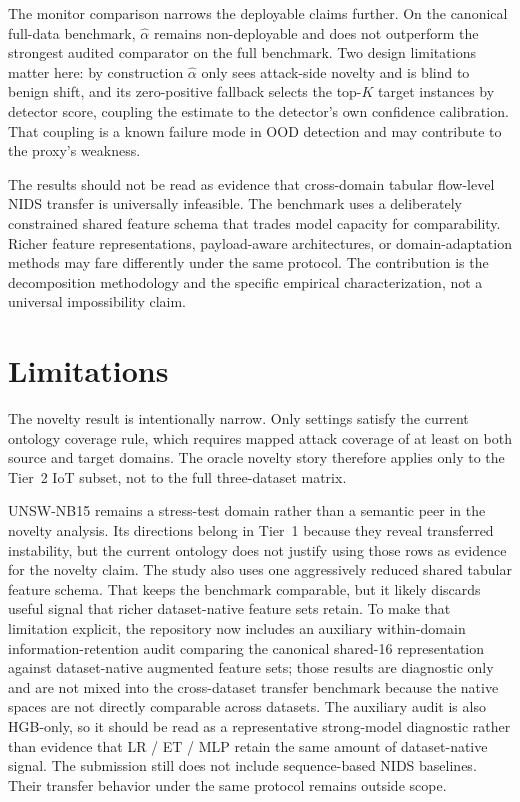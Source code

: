 \documentclass[preprint,12pt]{elsarticle}
\begin{document}
The monitor comparison narrows the deployable claims further. On the canonical full-data benchmark, $\hat{\alpha}$ remains non-deployable and does not outperform the strongest audited comparator on the full benchmark. Two design limitations matter here: by construction $\hat{\alpha}$ only sees attack-side novelty and is blind to benign shift, and its zero-positive fallback selects the top-$K$ target instances by detector score, coupling the estimate to the detector's own confidence calibration. That coupling is a known failure mode in OOD detection and may contribute to the proxy's weakness.

The results should not be read as evidence that cross-domain tabular flow-level NIDS transfer is universally infeasible. The benchmark uses a deliberately constrained shared feature schema that trades model capacity for comparability. Richer feature representations, payload-aware architectures, or domain-adaptation methods may fare differently under the same protocol. The contribution is the decomposition methodology and the specific empirical characterization, not a universal impossibility claim.

\section{Limitations}

The novelty result is intentionally narrow. Only \PrimaryIotSettingCount{} settings satisfy the current ontology coverage rule, which requires mapped attack coverage of at least \NoveltyCoverageFloor{} on both source and target domains. The oracle novelty story therefore applies only to the Tier~2 IoT subset, not to the full three-dataset matrix.

UNSW-NB15 remains a stress-test domain rather than a semantic peer in the novelty analysis. Its directions belong in Tier~1 because they reveal transferred instability, but the current ontology does not justify using those rows as evidence for the novelty claim. The study also uses one aggressively reduced shared tabular feature schema. That keeps the benchmark comparable, but it likely discards useful signal that richer dataset-native feature sets retain. To make that limitation explicit, the repository now includes an auxiliary within-domain information-retention audit comparing the canonical shared-16 representation against dataset-native augmented feature sets; those results are diagnostic only and are not mixed into the cross-dataset transfer benchmark because the native spaces are not directly comparable across datasets. The auxiliary audit is also HGB-only, so it should be read as a representative strong-model diagnostic rather than evidence that LR / ET / MLP retain the same amount of dataset-native signal. The submission still does not include sequence-based NIDS baselines. Their transfer behavior under the same protocol remains outside scope.
\end{document}
